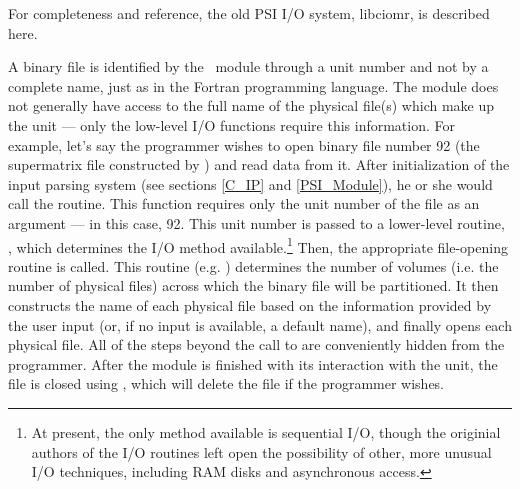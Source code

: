%
%
%
%
For completeness and reference, the old PSI I/O system, libciomr, is
described here.

A binary file is identified by the \PSIthree\ module through a unit
number and not by a complete name, just as in the Fortran programming
language.  The module does not generally have access to the full name
of the physical file(s) which make up the unit --- only the low-level
I/O functions require this information.  For example, let's say the
programmer wishes to open binary file number 92 (the supermatrix file
constructed by \PSIcscf) and read data from it.  After initialization
of the input parsing system (see sections \ref{C_IP} and
\ref{PSI_Module}), he or she would call the  routine.
This function requires only the unit number of the file as an argument
--- in this case, 92.  This unit number is passed to a lower-level
routine, , which determines the I/O method
available.\footnote{At present, the only method available is
sequential I/O, though the originial authors of the I/O routines left
open the possibility of other, more unusual I/O techniques, including
RAM disks and asynchronous access.}  Then, the appropriate
file-opening routine is called.  This routine
(e.g. ) determines the number of volumes
(i.e. the number of physical files) across which the binary file will
be partitioned.  It then constructs the name of each physical file
based on the information provided by the user input (or, if no input
is available, a default name), and finally opens each physical file.
All of the steps beyond the call to  are conveniently
hidden from the programmer.  After the module is finished with its
interaction with the unit, the file is closed using ,
which will delete the file if the programmer wishes.

